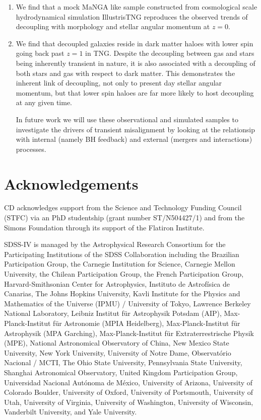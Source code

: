 \documentclass[fleqn,usenatbib]{mnras}
\begin{document}
\begin{enumerate}
    \item We find that a mock MaNGA like sample constructed from cosmological scale hydrodynamical simulation IllustrisTNG reproduces the observed trends of decoupling with morphology and stellar angular momentum at $z=0$.
    
    \item We find that decoupled galaxies reside in dark matter haloes with lower spin going back past $z=1$ in TNG. Despite the decoupling between gas and stars being inherently transient in nature, it is also associated with a decoupling of both stars and gas with respect to dark matter. This demonstrates the inherent link of decoupling, not only to present day stellar angular momentum, but that lower spin haloes are far more likely to host decoupling at any given time. 

In future work we will use these observational and simulated samples to investigate the drivers of transient misalignment by looking at the relationsip with internal (namely BH feedback) and external (mergers and interactions) processes. 

\end{enumerate}





\section*{Acknowledgements}
CD acknowledges support from the Science and Technology Funding Council (STFC) via an PhD studentship (grant number ST/N504427/1) and from the Simons Foundation through its support of the Flatiron Institute. 

SDSS-IV is managed by the Astrophysical Research Consortium for the Participating Institutions of the SDSS Collaboration including the Brazilian Participation Group, the Carnegie Institution for Science, Carnegie Mellon University, the Chilean Participation Group, the French Participation Group, Harvard-Smithsonian Center for Astrophysics, Instituto de Astrof\'isica de Canarias, The Johns Hopkins University, Kavli Institute for the Physics and Mathematics of the Universe (IPMU) / University of Tokyo, Lawrence Berkeley National Laboratory, Leibniz Institut f\"ur Astrophysik Potsdam (AIP), Max-Planck-Institut f\"ur Astronomie (MPIA Heidelberg), Max-Planck-Institut f\"ur Astrophysik (MPA Garching), Max-Planck-Institut f\"ur Extraterrestrische Physik (MPE), National Astronomical Observatory of China, New Mexico State University, New York University, University of Notre Dame, Observat\'orio Nacional / MCTI, The Ohio State University, Pennsylvania State University, Shanghai Astronomical Observatory, United Kingdom Participation Group, Universidad Nacional Aut\'onoma de M\'exico, University of Arizona, University of Colorado Boulder, University of Oxford, University of Portsmouth, University of Utah, University of Virginia, University of Washington, University of Wisconsin, Vanderbilt University, and Yale University.
\appendix
\end{document}
